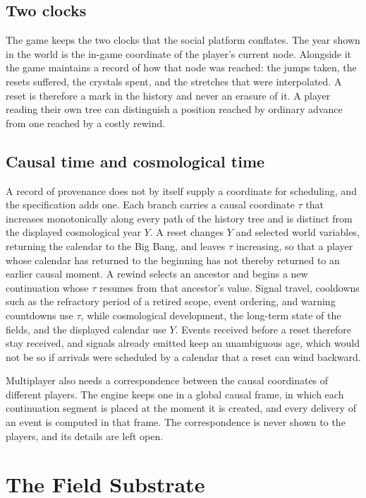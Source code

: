 \documentclass[11pt]{article}
\begin{document}
\subsection{Two clocks}

The game keeps the two clocks that the social platform conflates. The year shown in the world is the in-game coordinate of the player's current node. Alongside it the game maintains a record of how that node was reached: the jumps taken, the resets suffered, the crystals spent, and the stretches that were interpolated. A reset is therefore a mark in the history and never an erasure of it. A player reading their own tree can distinguish a position reached by ordinary advance from one reached by a costly rewind.

\subsection{Causal time and cosmological time}

A record of provenance does not by itself supply a coordinate for scheduling, and the specification adds one. Each branch carries a causal coordinate $\tau$ that increases monotonically along every path of the history tree and is distinct from the displayed cosmological year $Y$. A reset changes $Y$ and selected world variables, returning the calendar to the Big Bang, and leaves $\tau$ increasing, so that a player whose calendar has returned to the beginning has not thereby returned to an earlier causal moment. A rewind selects an ancestor and begins a new continuation whose $\tau$ resumes from that ancestor's value. Signal travel, cooldowns such as the refractory period of a retired scope, event ordering, and warning countdowns use $\tau$, while cosmological development, the long-term state of the fields, and the displayed calendar use $Y$. Events received before a reset therefore stay received, and signals already emitted keep an unambiguous age, which would not be so if arrivals were scheduled by a calendar that a reset can wind backward.

Multiplayer also needs a correspondence between the causal coordinates of different players. The engine keeps one in a global causal frame, in which each continuation segment is placed at the moment it is created, and every delivery of an event is computed in that frame. The correspondence is never shown to the players, and its details are left open.

\section{The Field Substrate}
\label{sec:fields}
\end{document}
